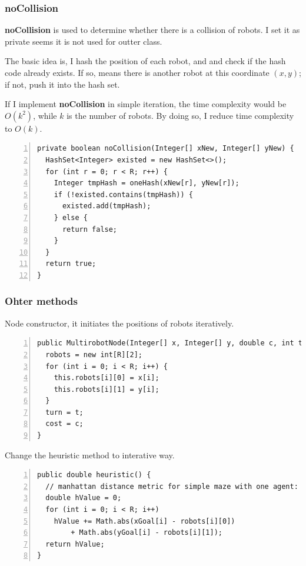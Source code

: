 \documentclass{article}
\begin{document}
\subsubsection{noCollision}

\textbf{noCollision} is used to determine whether there is a collision of robots. I set it as private seems it is not used for outter class.

The basic idea is, I hash the position of each robot, and and check if the hash code already exists. If so, means there is another robot at this coordinate $(x,y)$; if not, push it into the hash set.

If I implement \textbf{noCollision} in simple iteration, the time complexity would be $O(k^2)$, while $k$ is the number of robots. By doing so, I reduce time complexity to $O(k)$.

\begin{lstlisting}[numbers=left]
private boolean noCollision(Integer[] xNew, Integer[] yNew) {
  HashSet<Integer> existed = new HashSet<>();
  for (int r = 0; r < R; r++) {
    Integer tmpHash = oneHash(xNew[r], yNew[r]);
    if (!existed.contains(tmpHash)) {
      existed.add(tmpHash);
    } else {
      return false;
    }
  }
  return true;
}
\end{lstlisting}




\subsubsection{Ohter methods}
Node constructor, it initiates the positions of robots iteratively.

\begin{lstlisting}[numbers=left]
public MultirobotNode(Integer[] x, Integer[] y, double c, int t) {
  robots = new int[R][2];
  for (int i = 0; i < R; i++) {
    this.robots[i][0] = x[i];
    this.robots[i][1] = y[i];
  }
  turn = t;
  cost = c;
}
\end{lstlisting}

Change the heuristic method to interative way.

\begin{lstlisting}[numbers=left]
public double heuristic() {
  // manhattan distance metric for simple maze with one agent:
  double hValue = 0;
  for (int i = 0; i < R; i++)
    hValue += Math.abs(xGoal[i] - robots[i][0])
        + Math.abs(yGoal[i] - robots[i][1]);
  return hValue;
}
\end{lstlisting}
\end{document}
